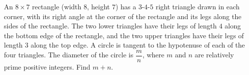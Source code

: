 An $8\times7$ rectangle (width $8$, height $7$) has a $3$-$4$-$5$ right triangle drawn in each corner, with its right angle at the corner of the rectangle and its legs along the sides of the rectangle. The two lower triangles have their legs of length $4$ along the bottom edge of the rectangle, and the two upper triangles have their legs of length $3$ along the top edge. A circle is tangent to the hypotenuse of each of the four triangles. The diameter of the circle is $\dfrac {m}{n}$, where $m$ and $n$ are relatively prime positive integers. Find $m+n$.
